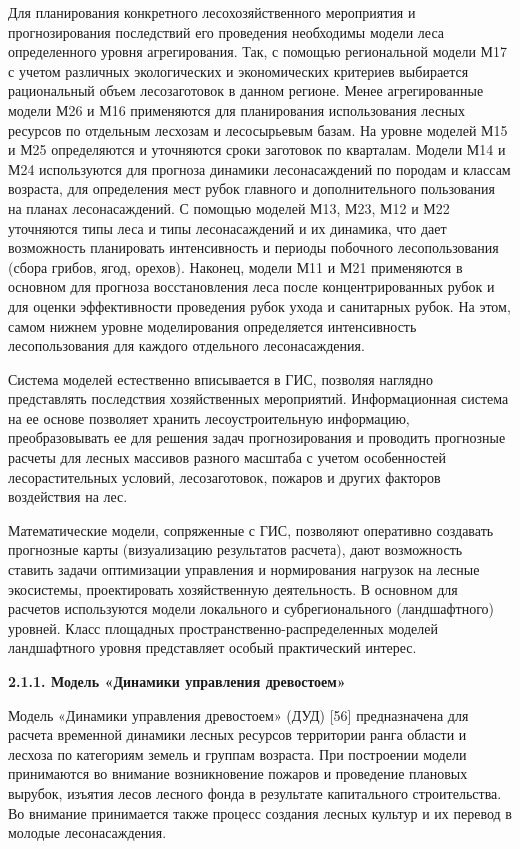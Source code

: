 \documentclass{article}
\begin{document}
Для планирования конкретного лесохозяйственного 
мероприятия и прогнозирования последствий 
его проведения необходимы модели леса определенного 
уровня агрегирования. Так, с помощью региональной 
модели М17 с учетом различных экологических 
и экономических критериев выбирается рациональный 
объем лесозаготовок в данном регионе. Менее 
агрегированные модели М26 и М16 применяются для 
планирования использования лесных ресурсов 
по отдельным лесхозам и лесосырьевым базам. 
На уровне моделей М15 и М25 определяются и уточняются 
сроки заготовок по кварталам. Модели М14 и М24 
используются для прогноза динамики лесонасаждений 
по породам и классам возраста, для определения 
мест рубок главного и дополнительного пользования 
на планах лесонасаждений. С помощью моделей 
М13, М23, М12 и М22 уточняются типы леса и типы лесонасаждений 
и их динамика, что дает возможность планировать 
интенсивность и периоды побочного лесопользования 
(сбора грибов, ягод, орехов). Наконец, модели 
М11 и М21 применяются в основном для прогноза 
восстановления леса после концентрированных 
рубок и для оценки эффективности проведения 
рубок ухода и санитарных рубок. На этом, самом 
нижнем уровне моделирования определяется интенсивность 
лесопользования для каждого отдельного лесонасаждения.

Система моделей естественно вписывается в 
ГИС, позволяя наглядно представлять последствия 
хозяйственных мероприятий. Информационная 
система на ее основе позволяет хранить лесоустроительную 
информацию, преобразовывать ее для решения 
задач прогнозирования и проводить прогнозные 
расчеты для лесных массивов разного масштаба 
с учетом особенностей лесорастительных условий, 
лесозаготовок, пожаров и других факторов воздействия 
на лес. 

Математические модели, сопряженные с ГИС, позволяют 
оперативно создавать прогнозные карты (визуализацию 
результатов расчета), дают возможность ставить 
задачи оптимизации управления и нормирования 
нагрузок на лесные экосистемы, проектировать 
хозяйственную деятельность. В основном для 
расчетов используются модели локального и 
субрегионального (ландшафтного) уровней. Класс 
площадных пространственно-распределенных 
моделей ландшафтного уровня представляет особый 
практический интерес.  \label{HToc199746721}

\textbf{2.1.1. Модель «Динамики управления древостоем» 
}

Модель «Динамики управления древостоем» (ДУД) 
[56]  предназначена для расчета временной динамики 
лесных ресурсов территории ранга области и 
лесхоза по категориям земель и группам возраста. 
При построении модели принимаются во внимание 
возникновение пожаров и проведение плановых 
вырубок, изъятия лесов лесного фонда в результате 
капитального строительства. Во внимание принимается 
также процесс создания лесных культур и их 
перевод в молодые лесонасаждения. 
\end{document}

